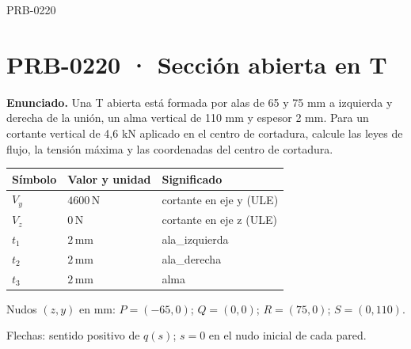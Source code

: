 \Needspace{.3\textheight}

\begin{studiumworked}{PRB-0220}

\section{PRB-0220 · Sección abierta en T}

\textbf{Enunciado.} Una T abierta está formada por alas de 65 y 75 mm a izquierda y derecha de la unión, un alma vertical de 110 mm y espesor 2 mm. Para un cortante vertical de 4,6 kN aplicado en el centro de cortadura, calcule las leyes de flujo, la tensión máxima y las coordenadas del centro de cortadura.

\par\medskip\noindent\begin{tabular}{@{}p{.18\linewidth}p{.26\linewidth}p{.48\linewidth}@{}}
\toprule Símbolo & Valor y unidad & Significado\\\midrule
$V_{y}$ & $4600\,\mathrm{N}$ & cortante en eje y (ULE)\\
$V_{z}$ & $0\,\mathrm{N}$ & cortante en eje z (ULE)\\
$t_{1}$ & $2\,\mathrm{mm}$ & ala\_izquierda\\
$t_{2}$ & $2\,\mathrm{mm}$ & ala\_derecha\\
$t_{3}$ & $2\,\mathrm{mm}$ & alma\\
\bottomrule\end{tabular}\par\medskip

\par\medskip\noindent\begin{minipage}{\linewidth}\centering
{}
\par\small Nudos $(z,y)$ en mm: $P=(-65,0)$; $Q=(0,0)$; $R=(75,0)$; $S=(0,110)$.
\par\small Flechas: sentido positivo de $q(s)$; $s=0$ en el nudo inicial de cada pared.
\par\normalsize\end{minipage}\par\medskip


\end{studiumworked}
